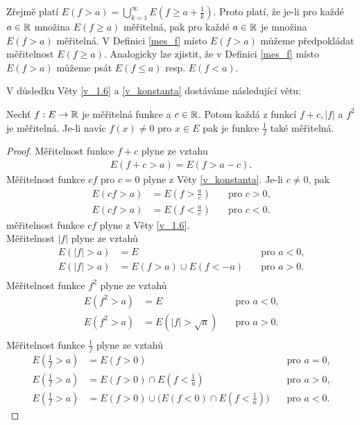 \begin{poznamka}
Zřejmě platí $E(f>a)=\bigcup \limits _{k=1}^{\infty} E(f \geq a+ \frac{1}{k})$.
Proto platí, že je-li pro každé $a \in \mathbb{R}$ množina $E(f \geq a) $ měřitelná, pak pro každé $a \in \mathbb{R}$ je množina $E(f>a)$ měřitelná.
V Definici \ref{mes_f} místo $E(f>a)$ můžeme předpokládat měřitelnost $E(f \geq a)$.
Analogicky lze zjistit, že v Definici \ref{mes_f} místo $E(f>a)$ můžeme psát $E(f \leq a)$ resp. $E(f<a)$.
\label{p_1}
\end{poznamka}

V důsledku Věty \ref{v_1.6} a \ref{v_konstanta} dostáváme následující větu:

\begin{theorem}
Nechť $f:E \to \mathbb{R}$ je měřitelná funkce a $c \in \mathbb{R}$. 
Potom každá z funkcí $f+c, |f|$ a $f^2$ je měřitelná.
Je-li navíc $f(x) \neq 0$ pro $x \in E$ pak je funkce $\frac{1}{f}$ také měřitelná.
\label{v_1.7}
\end{theorem}

\begin{proof}
Měřitelnost funkce $f+c$ plyne ze vztahu 
\begin{align*}
E(f+c>a)=E(f>a-c).
\end{align*}
Měřitelnost funkce $cf$ pro $ c=0$ plyne z Věty \ref{v_konstanta}. 
Je-li $c \neq 0$, pak
\begin{align*}
E(cf>a)&=E(f>\frac{a}{c}) \quad & \textrm{pro $c>0$,} \\
E(cf>a)&=E(f<\frac{a}{c}) \quad & \textrm{pro $c<0$.}
\end{align*}
měřitelnost funkce $cf$ plyne z Věty \ref{v_1.6}. \\
Měřitelnost $|f|$ plyne ze vztah\r u 
\begin{align*}
E(|f|>a)&=E \quad & \textrm{pro $a<0$,} \\
E(|f|>a)&=E(f>a) \cup E(f<-a) \quad & \textrm{pro $a>0$.} \\
\end{align*}
Měřitelnost funkce $f^2$ plyne ze vztah\r u
\begin{align*}
E(f^2>a)&=E \quad & \textrm{pro $a<0$,} \\
E(f^2>a)&=E(|f|>\sqrt{a})\quad & \textrm{pro $a>0$.} \\
\end{align*}
Měřitelnost funkce $\frac{1}{f}$ plyne ze vztah\r u
\begin{align*}
E(\frac{1}{f}>a)&=E(f>0) \quad & \textrm{pro $a=0$,} \\
E(\frac{1}{f}>a)&=E(f>0) \cap E(f<\frac{1}{a}) \quad & \textrm{pro $a>0$,} \\
E(\frac{1}{f}>a)&=E(f>0) \cup \Big(E(f<0) \cap E(f<\frac{1}{a})\Big) \quad & \textrm{pro $a<0$.} 
\end{align*}
\end{proof}

